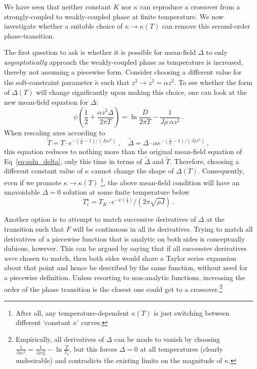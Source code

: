 We have seen that neither constant $ K $ nor $ \kappa $ can reproduce a crossover from a strongly-coupled to weakly-coupled phase at finite temperature. We now investigate whether a suitable choice of $ \kappa \rightarrow \kappa(T) $ can remove this second-order phase-transition.

The first question to ask is whether it is possible for mean-field $ \Delta $ to only \emph{asymptotically} approach the weakly-coupled phase as temperature is increased, thereby not assuming a piecewise form. Consider choosing a different value for the soft-constraint parameter $ \widetilde{\kappa} $ such that $ z^2 \rightarrow \widetilde{z^2} = \alpha z^2 $. To see whether the form of $ \Delta(T) $ will change significantly upon making this choice, one can look at the new mean-field equation for $ \Delta $:
\begin{equation}
\psi \left( \frac{1}{2} + \frac{\alpha z^2 \Delta}{2 \pi T} \right) = \ln{\frac{D}{2 \pi T}} - \frac{1}{J \rho ~ \alpha z^2} ~ .
\end{equation}
When rescaling axes according to
\begin{equation}
\widetilde{T} = T \cdot e^{- \left( \frac{1}{\alpha} - 1 \right) / (J \rho z^2)} ~, \quad \widetilde{\Delta} = \Delta \cdot \alpha e^{- \left( \frac{1}{\alpha} - 1 \right) / (J \rho z^2)} ~ ,
\end{equation}
this equation reduces to nothing more than the original mean-field equation of Eq~\eqref{eq:soln_delta}, only this time in terms of $ \widetilde{\Delta} $ and $ \widetilde{T} $.
Therefore, choosing a different constant value of $ \kappa $ cannot change the shape of $ \Delta(T) $. Consequently, even if we promote $ \kappa \rightarrow \kappa(T) $ \footnote{After all, any temperature-dependent $ \kappa(T) $ is just switching between different `constant $ \kappa $' curves.}, the above mean-field condition will have an unavoidable $ \Delta = 0 $ solution at some finite temperature below
\begin{equation}
T^{\star}_c = T_K \cdot e^{- \psi \left( \frac{1}{2} \right)} / \left( 2 \pi \sqrt{\rho J} \right)~.
\end{equation}

Another option is to attempt to match successive derivatives of $ \Delta $ at the transition such that $ F $ will be continuous in all its derivatives. Trying to match all derivatives of a piecewise function that is analytic on both sides is conceptually dubious, however. This can be argued by saying that if all successive derivatives \textit{were} chosen to match, then both sides would share a Taylor series expansion about that point and hence be described by the same function, without need for a piecewise definition. Unless resorting to non-analytic functions, increasing the order of the phase transition is the closest one could get to a crossover.\footnote{Empirically, all derivatives of $ \Delta $ can be made to vanish by choosing $ \frac{1}{J \rho z^2} = \frac{1}{J \rho z_0^2} - \ln{\frac{T}{T_c}} $, but this forces $ \Delta = 0 $ at all temperatures (clearly undesirable) and contradicts the existing limits on the magnitude of $ \kappa $.}

